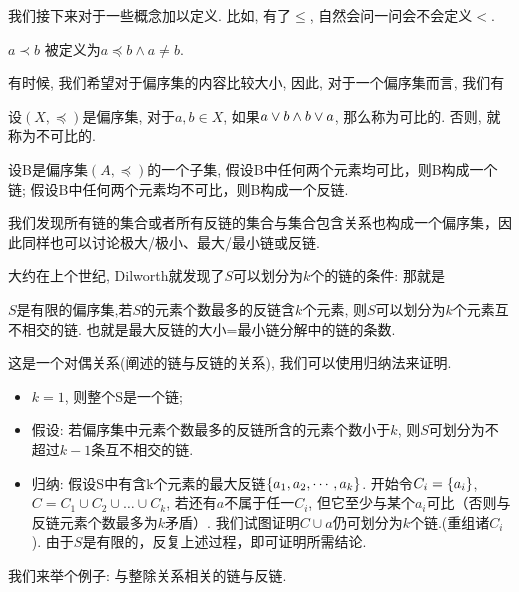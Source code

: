 我们接下来对于一些概念加以定义. 比如, 有了$\leq$, 自然会问一问会不会定义$<$. 

\begin{definition}
$a \prec b$ 被定义为$a\preceq b \land a \neq b$.
\end{definition}


有时候, 我们希望对于偏序集的内容比较大小, 因此, 对于一个偏序集而言, 我们有

\begin{definition}
	设$(X,\preceq)$是偏序集, 对于$a,b\in X$, 如果$a\lor b \land b\lor a$, 那么称为可比的. 否则, 就称为不可比的. 
\end{definition}

\begin{definition}[链]
	设B是偏序集$(A,\preceq)$的一个子集, 假设B中任何两个元素均可比，则B构成一个链; 假设B中任何两个元素均不可比，则B构成一个反链. 
\end{definition}

我们发现所有链的集合或者所有反链的集合与集合包含关系也构成一个偏序集，因此同样也可以讨论极大/极小、最大/最小链或反链. 

大约在上个世纪, Dilworth就发现了$S$可以划分为$k$个的链的条件: 那就是

\begin{theorem}
$S$是有限的偏序集,若$S$的元素个数最多的反链含$k$个元素, 则$S$可以划分为$k$个元素互不相交的链. 也就是{\red 最大}{\blue 反链}的大小={\red 最小}{\blue 链分解}中的链的条数. 
\end{theorem} 

这是一个对偶关系(阐述的链与反链的关系), 我们可以使用归纳法来证明. 

\begin{itemize}
	\item $k=1$, 则整个S是一个链;
	\item 假设: 若偏序集中元素个数最多的反链所含的元素个数小于$k$, 则$S$可划分为不超过$k-1$条互不相交的链.
	\item 归纳: 假设S中有含k个元素的最大反链$\{a_1, a_2, \cdots, a_k\}$. 开始令$C_i=\{a_i\}$, $C=C_1\cup C_2\cup …\cup C_k$, 若还有$a$不属于任一$C_i$, 但它至少与某个$a_i$可比（否则与反链元素个数最多为$k$矛盾）. 我们试图证明$C\cup {a}$仍可划分为$k$个链.(重组诸$C_i$). 由于$S$是有限的，反复上述过程，即可证明所需结论. 
\end{itemize}





我们来举个例子: 与整除关系相关的链与反链. 



